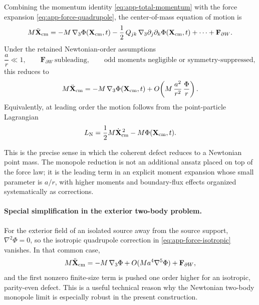 \documentclass[11pt]{article}
\newcommand{\gradThree}{\nabla_3}
\newcommand{\PhiN}{\Phi}
\begin{document}
Combining the momentum identity \eqref{eq:app-total-momentum} with the force expansion
\eqref{eq:app-force-quadrupole}, the center-of-mass equation of motion is
\begin{equation}
M\ddot{\mathbf X}_{\rm cm}
=
- M\,\gradThree\PhiN(\mathbf X_{\rm cm},t)
-\frac12\,Q_{jk}\,\gradThree\partial_j\partial_k\PhiN(\mathbf X_{\rm cm},t)
+\cdots
+\mathbf F_{\partial W}.
\label{eq:app-cm-eom-expanded}
\end{equation}
Under the retained Newtonian-order assumptions
\begin{equation}
\frac{a}{r}\ll 1,
\qquad
\mathbf F_{\partial W}\ \text{subleading},
\qquad
\text{odd moments negligible or symmetry-suppressed},
\label{eq:app-retained-assumptions}
\end{equation}
this reduces to
\begin{equation}
M\ddot{\mathbf X}_{\rm cm}
=
- M\,\gradThree\PhiN(\mathbf X_{\rm cm},t)
+
O\!\left(M\,\frac{a^2}{r^2}\,\frac{\PhiN}{r}\right).
\label{eq:app-cm-eom-mono}
\end{equation}
Equivalently, at leading order the motion follows from the point-particle Lagrangian
\begin{equation}
L_{\rm N}
=
\frac12 M\dot{\mathbf X}_{\rm cm}^{\,2}
-
M\PhiN(\mathbf X_{\rm cm},t).
\label{eq:app-point-particle-lag}
\end{equation}

This is the precise sense in which the coherent defect reduces to a Newtonian point mass.
The monopole reduction is not an additional ansatz placed on top of the force law; it is
the leading term in an explicit moment expansion whose small parameter is \(a/r\), with
higher moments and boundary-flux effects organized systematically as corrections.

\paragraph{Special simplification in the exterior two-body problem.}
For the exterior field of an isolated source away from the source support,
\(\nabla^2\PhiN=0\), so the isotropic quadrupole correction in
\eqref{eq:app-force-isotropic} vanishes. In that common case,
\begin{equation}
M\ddot{\mathbf X}_{\rm cm}
=
- M\,\gradThree\PhiN
+
O(Ma^4\nabla^5\PhiN)
+
\mathbf F_{\partial W},
\label{eq:app-cm-eom-harmonic}
\end{equation}
and the first nonzero finite-size term is pushed one order higher for an isotropic,
parity-even defect. This is a useful technical reason why the Newtonian two-body monopole
limit is especially robust in the present construction.
\end{document}

